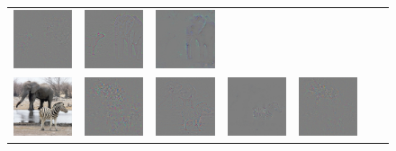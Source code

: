 \begin{figure}
\begin{center}
\begin{tabular}{ccccccc}
\includegraphics[width=0.14\linewidth,height=0.115\linewidth]{figs/examples/googlenet/oxford/zeb-ele1_diff_387} &
\includegraphics[width=0.14\linewidth,height=0.115\linewidth]{figs/examples/googlenet/deconv/zeb-ele1_diff_387} &
\includegraphics[width=0.14\linewidth,height=0.115\linewidth]{figs/examples/googlenet/soft/zeb-ele1_diff_387} \\
\includegraphics[width=0.14\linewidth,height=0.115\linewidth]{figs/examples/googlenet/oxford/zeb-ele2} &
\includegraphics[width=0.14\linewidth,height=0.115\linewidth]{figs/examples/googlenet/oxford/zeb-ele2_diff_341} &
\includegraphics[width=0.14\linewidth,height=0.115\linewidth]{figs/examples/googlenet/deconv/zeb-ele2_diff_341} &
\includegraphics[width=0.14\linewidth,height=0.115\linewidth]{figs/examples/googlenet/soft/zeb-ele2_diff_341} &
\includegraphics[width=0.14\linewidth,height=0.115\linewidth]{figs/examples/googlenet/oxford/zeb-ele2_diff_387} &

\end{tabular}
\end{center}
\end{figure}
